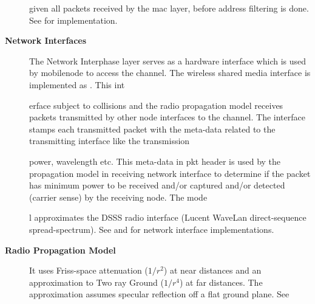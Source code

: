 \begin{description}
given all packets received by the mac layer, before address filtering is done. See  for  implementation.

\item[{\bf Network Interfaces}] The Network Interphase layer serves as a hardware interface which is used by mobilenode to access the channel. The wireless shared media interface is implemented as . This int






















erface subject to collisions and the radio propagation model receives packets transmitted by other node interfaces to the channel. The interface stamps each transmitted packet with the meta-data related to the transmitting interface like the transmission 






















power, wavelength etc. This meta-data in pkt header is used by the propagation model in receiving network interface to determine if the packet has minimum power to be received and/or captured and/or detected (carrier sense) by the receiving node. The mode






















l approximates the DSSS radio interface (Lucent WaveLan direct-sequence spread-spectrum). See  and  for network interface implementations.

\item[{\bf Radio Propagation Model}]  It uses Friss-space attenuation ($1/r^2$) at near distances and an approximation to Two ray Ground ($1/r^4$) at far distances. The approximation assumes specular reflection off a flat ground plane. See 
\end{description}
